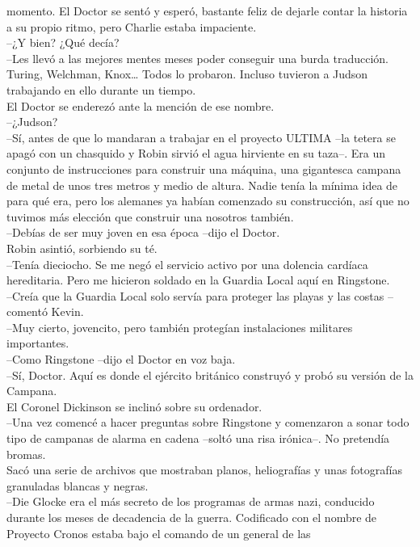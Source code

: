 momento. El Doctor se sentó y esperó, bastante feliz de dejarle contar
la historia a su propio ritmo, pero Charlie estaba impaciente.\\
--¿Y bien? ¿Qué decía?\\
--Les llevó a las mejores mentes meses poder conseguir una burda
traducción. Turing, Welchman, Knox\ldots{} Todos lo probaron. Incluso
tuvieron a Judson trabajando en ello durante un tiempo.\\
El Doctor se enderezó ante la mención de ese nombre.\\
--¿Judson?\\
--Sí, antes de que lo mandaran a trabajar en el proyecto ULTIMA --la
tetera se apagó con un chasquido y Robin sirvió el agua hirviente en su
taza--. Era un conjunto de instrucciones para construir una máquina, una
gigantesca campana de metal de unos tres metros y medio de altura. Nadie
tenía la mínima idea de para qué era, pero los alemanes ya habían
comenzado su construcción, así que no tuvimos más elección que construir
una nosotros también.\\
--Debías de ser muy joven en esa época --dijo el Doctor.\\
Robin asintió, sorbiendo su té.\\
--Tenía dieciocho. Se me negó el servicio activo por una dolencia
cardíaca hereditaria. Pero me hicieron soldado en la Guardia Local aquí
en Ringstone.\\
--Creía que la Guardia Local solo servía para proteger las playas y las
costas --comentó Kevin.\\
--Muy cierto, jovencito, pero también protegían instalaciones militares
importantes.\\
--Como Ringstone --dijo el Doctor en voz baja.\\
--Sí, Doctor. Aquí es donde el ejército británico construyó y probó su
versión de la Campana.\\[2\baselineskip]El Coronel Dickinson se inclinó
sobre su ordenador.\\
--Una vez comencé a hacer preguntas sobre Ringstone y comenzaron a sonar
todo tipo de campanas de alarma en cadena --soltó una risa irónica--. No
pretendía bromas.\\
Sacó una serie de archivos que mostraban planos, heliografías y unas
fotografías granuladas blancas y negras.\\
--Die Glocke era el más secreto de los programas de armas nazi,
conducido durante los meses de decadencia de la guerra. Codificado con
el nombre de Proyecto Cronos estaba bajo el comando de un general de las
